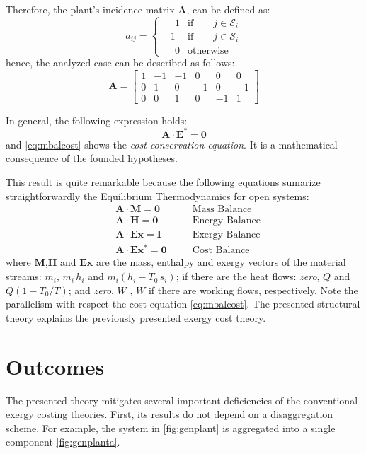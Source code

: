 \documentclass[energies,article,submit,moreauthors,pdftex]{Definitions/mdpi}
\newcommand{\vm}[1]{\ensuremath{\mathbf{#1}}}
\begin{document}
Therefore, the plant's incidence matrix $\vm{A}$, can be defined as:
\begin{equation}
    a_{ij}=\begin{cases}
    \phantom{-}1 & \text{if}\qquad j\in\mathcal{E}_i \\
    -1 & \text{if}\qquad j\in\mathcal{S}_i \\
    \phantom{-}0 & \text{otherwise}
    \end{cases}
\end{equation}
hence, the analyzed case can be described as follows:
\begin{equation*}
    \vm{A}=\left[\begin{array}{rrrrrr}
    1 & -1 & -1 &  0 &  0 &  0 \\
    0 &  1 &  0 & -1 &  0 & -1 \\
    0 &  0 &  1 &  0 & -1 &  1
    \end{array}\right]
\end{equation*}

In general, the following expression holds:
\begin{equation}
    \vm{A} \cdot \vm{E}^{*} = \vm{0}
    \label{eq:mbalcost}
\end{equation}
and \cref{eq:mbalcost} shows the \emph{cost conservation equation}. It is a mathematical consequence of the founded hypotheses.

This result is quite remarkable because the following equations sumarize straightforwardly the Equilibrium Thermodynamics for open systems:
\begin{align}
    &\vm{A}\cdot\vm{M} = \vm{0} &\quad & \text{Mass Balance} \label{eq:a1} \\
    &\vm{A}\cdot\vm{H} = \vm{0} &\quad & \text{Energy Balance} \label{eq:a2}\\
    &\vm{A}\cdot\vm{Ex} = \vm{I} &\quad & \text{Exergy Balance} \label{eq:a3}\\
    &\vm{A}\cdot\vm{Ex^*} = \vm{0} &\quad & \text{Cost Balance} \label{eq:a4}
\end{align}
where \vm{M},\vm{H} and \vm{Ex} are the mass, enthalpy and exergy vectors of the material streams: $m_i$, $m_i\,h_i$ and $m_i(h_i-T_0\,s_i)$; if there are the heat flows: \emph{zero}, $Q$ and $Q(1-T_0/T)$; and \emph{zero}, $W$ , $W$ if there are working flows, respectively. Note the  parallelism with respect the cost equation \eqref{eq:mbalcost}. The presented structural theory explains the previously presented exergy cost theory.

\section{Outcomes}
The presented theory mitigates several important deficiencies of the conventional exergy costing theories. First, its results do not depend on a disaggregation scheme. For example, the system in \cref{fig:genplant} is aggregated into a single component \cref{fig:genplanta}.
\end{document}
